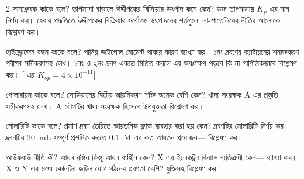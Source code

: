\documentclass[10pt]{article}
\begin{document}
\begin{multicols}{2}
{সাম্যধ্রুবক কাকে বলে?}
{তাপমাত্রা বাড়ালে উদ্দীপকের বিক্রিয়ার উৎপাদ কমে কেন?}
{উক্ত তাপমাত্রায় $K_p$ এর মান নির্ণয় কর।}
{হেবার পদ্ধতিতে উদ্দীপকের বিক্রিয়ার সর্বোত্তম উৎপাদনের শর্তগুলো লা-শাতেলিয়ের নীতির আলোকে বিশ্লেষণ কর।}

{হাইড্রোজেন বন্ধন কাকে বলে?}
{পানির ডাইপোল মোমেন্ট থাকার কারণ ব্যাখ্যা কর।}
{১নং দ্রবণের ক্যাটায়নের শনাক্তকরণ পরীক্ষা সমীকরণসহ লেখ।}
{১নং ও ২নং দ্রবণ একত্রে মিশ্রিত করলে  এর অধঃক্ষেপ পড়বে কি না গাণিতিকভাবে বিশ্লেষণ কর। [ এর $K_{sp}=4\times10^{-11}$]}

{পোলারায়ন কাকে বলে?}
{সোডিয়ামের দ্বিতীয় আয়নিকরণ শক্তি অনেক বেশি কেন?}
{খাদ্য সংরক্ষক A এর প্রস্তুতি সমীকরণসহ লেখ।}
{A যৌগটির খাদ্য সংরক্ষক হিসেবে উপযুক্ততা বিশ্লেষণ কর।}

{মোলারিটি কাকে বলে?}
{প্রমাণ দ্রবণ তৈরিতে আয়তনিক ফ্লাস্ক ব্যবহার করা হয় কেন?}
{দ্রবণটির মোলারিটি নির্ণয় কর।}
{দ্রবণটির \SI{20}{mL} সম্পূর্ণ প্রশমিত করতে \SI{0.1}{M}  এর কত আয়তন প্রয়োজন— বিশ্লেষণ কর।}

{আউফবাউ নীতি কী?}
{ আয়ন রঙিন কিন্তু  আয়ন বর্ণহীন কেন?}
{X এর ইলেকট্রন বিন্যাস ব্যতিক্রমী কেন— ব্যাখ্যা কর।}
{X ও Y এর মধ্যে কোনটির জটিল যৌগ গঠনের প্রবণতা বেশি? যুক্তিসহ বিশ্লেষণ কর।}
\end{multicols}
\end{document}
